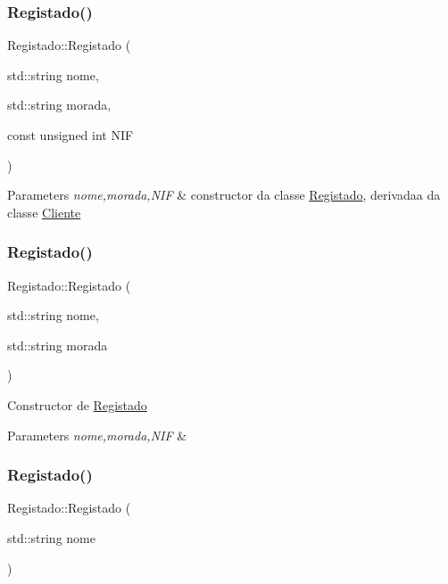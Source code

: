 \subsubsection{\texorpdfstring{Registado()}{Registado()}\hspace{0.1cm}{\footnotesize\ttfamily [1/3]}}
{\footnotesize\ttfamily Registado\+::\+Registado (\begin{DoxyParamCaption}\item[{std\+::string}]{nome,  }\item[{std\+::string}]{morada,  }\item[{const unsigned int}]{N\+IF }\end{DoxyParamCaption})}


\begin{DoxyParams}{Parameters}
{\em nome,morada,N\+IF} & constructor da classe \hyperlink{class_registado}{Registado}, derivadaa da classe \hyperlink{class_cliente}{Cliente} \\
\hline
\end{DoxyParams}
\hypertarget{class_registado_a2ebad03ff43e207581c62952a88129b4}{}\label{class_registado_a2ebad03ff43e207581c62952a88129b4} 
\subsubsection{\texorpdfstring{Registado()}{Registado()}\hspace{0.1cm}{\footnotesize\ttfamily [2/3]}}
{\footnotesize\ttfamily Registado\+::\+Registado (\begin{DoxyParamCaption}\item[{std\+::string}]{nome,  }\item[{std\+::string}]{morada }\end{DoxyParamCaption})}

Constructor de \hyperlink{class_registado}{Registado} 
\begin{DoxyParams}{Parameters}
{\em nome,morada,N\+IF} & \\
\hline
\end{DoxyParams}
\hypertarget{class_registado_a67a8d0c0dbd3103deae8813eb0958752}{}\label{class_registado_a67a8d0c0dbd3103deae8813eb0958752} 
\subsubsection{\texorpdfstring{Registado()}{Registado()}\hspace{0.1cm}{\footnotesize\ttfamily [3/3]}}
{\footnotesize\ttfamily Registado\+::\+Registado (\begin{DoxyParamCaption}\item[{std\+::string}]{nome }\end{DoxyParamCaption})}


